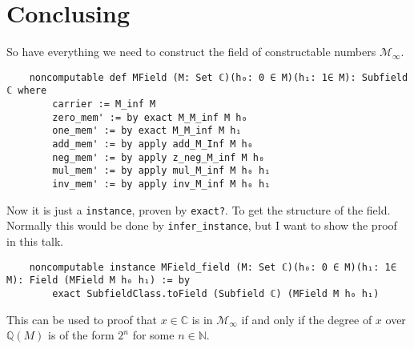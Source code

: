 \section{Conclusing}

So have everything we need to construct the field of constructable numbers $\mathcal{M}_{\infty}$.
\begin{lstlisting}
    noncomputable def MField (M: Set ℂ)(h₀: 0 ∈ M)(h₁: 1∈ M): Subfield ℂ where
        carrier := M_inf M
        zero_mem' := by exact M_M_inf M h₀
        one_mem' := by exact M_M_inf M h₁
        add_mem' := by apply add_M_Inf M h₀
        neg_mem' := by apply z_neg_M_inf M h₀
        mul_mem' := by apply mul_M_inf M h₀ h₁
        inv_mem' := by apply inv_M_inf M h₀ h₁
\end{lstlisting}

Now it is just a \verb|instance|, proven by \verb|exact?|. To get the structure of the field. Normally this would be done by \verb|infer_instance|, but I want to show the proof in this talk.
\begin{lstlisting}
    noncomputable instance MField_field (M: Set ℂ)(h₀: 0 ∈ M)(h₁: 1∈ M): Field (MField M h₀ h₁) := by
        exact SubfieldClass.toField (Subfield ℂ) (MField M h₀ h₁)
\end{lstlisting}

This can be used to proof that $x\in \mathbb{C}$ is in $\mathcal{M}_{\infty}$ if and only if the degree of $x$ over $\mathbb{Q}(M)$ is of the form $2^n$ for some $n\in \mathbb{N}$.